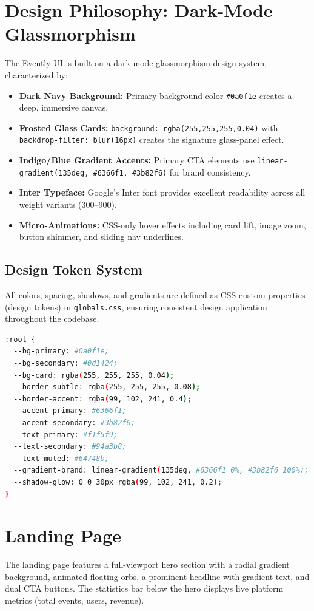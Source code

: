 \documentclass[12pt,a4paper]{report}
\begin{document}
\section{Design Philosophy: Dark-Mode Glassmorphism}
The Evently UI is built on a dark-mode glassmorphism design system, characterized by:
\begin{itemize}[leftmargin=2em]
    \item \textbf{Dark Navy Background:} Primary background color \texttt{\#0a0f1e} creates a deep, immersive canvas.
    \item \textbf{Frosted Glass Cards:} \texttt{background: rgba(255,255,255,0.04)} with \texttt{backdrop-filter: blur(16px)} creates the signature glass-panel effect.
    \item \textbf{Indigo/Blue Gradient Accents:} Primary CTA elements use \texttt{linear-gradient(135deg, \#6366f1, \#3b82f6)} for brand consistency.
    \item \textbf{Inter Typeface:} Google's Inter font provides excellent readability across all weight variants (300--900).
    \item \textbf{Micro-Animations:} CSS-only hover effects including card lift, image zoom, button shimmer, and sliding nav underlines.
\end{itemize}

\subsection{Design Token System}
All colors, spacing, shadows, and gradients are defined as CSS custom properties (design tokens) in \texttt{globals.css}, ensuring consistent design application throughout the codebase.

\begin{lstlisting}[language=bash, caption=CSS Design Tokens in globals.css]
:root {
  --bg-primary: #0a0f1e;
  --bg-secondary: #0d1424;
  --bg-card: rgba(255, 255, 255, 0.04);
  --border-subtle: rgba(255, 255, 255, 0.08);
  --border-accent: rgba(99, 102, 241, 0.4);
  --accent-primary: #6366f1;
  --accent-secondary: #3b82f6;
  --text-primary: #f1f5f9;
  --text-secondary: #94a3b8;
  --text-muted: #64748b;
  --gradient-brand: linear-gradient(135deg, #6366f1 0%, #3b82f6 100%);
  --shadow-glow: 0 0 30px rgba(99, 102, 241, 0.2);
}
\end{lstlisting}

\section{Landing Page}
The landing page features a full-viewport hero section with a radial gradient background, animated floating orbs, a prominent headline with gradient text, and dual CTA buttons. The statistics bar below the hero displays live platform metrics (total events, users, revenue).
\end{document}
